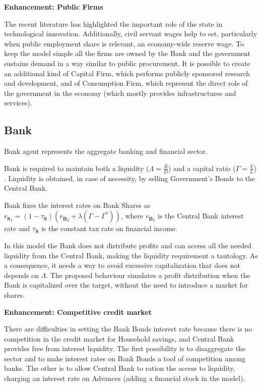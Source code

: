 \documentclass[a4paper, headings=standardclasses]{scrartcl}
\newenvironment{enh}[1][]{\begin{framed}\noindent\textbf{Enhancement: #1}\par}{\end{framed}}
\begin{document}
\begin{enh}[Public Firms]
	The recent literature has highlighted the important role of the state in technological innovation. Additionally, civil servant wages help to set, particularly when public employment share is relevant, an economy-wide reserve wage.
	To keep the model simple all the firms are owned by the Bank and the government sustains demand in a way similar to public procurement.
	It is possible to create an additional kind of Capital Firm, which performs publicly sponsored research and development, and of Consumption Firm, which represent the direct role of the government in the economy (which mostly provides infrastructures and services).
\end{enh}


\subsection{Bank}
Bank agent represents the aggregate banking and financial sector.

Bank is required to maintain both a liquidity ($\Lambda = \frac{R}{D}$) and a capital ratio ($\Gamma = \frac{V}{L}$) \parencite[see][]{caiani2016}. Liquidity is obtained, in case of necessity, by selling Government's Bonds to the Central Bank.

Bank fixes the interest rates on Bank Shares as ${r_\mathbf{S}}_t = (1 - \tau_\mathbf{S}) ({r_\mathbf{B}}_t + \lambda(\Gamma - \Gamma^*))$, where ${r_\mathbf{B}}_t$ is the Central Bank interest rate and $\tau_\mathbf{S}$ is the constant tax rate on financial income.

In this model the Bank does not distribute profits and can access all the needed liquidity from the Central Bank, making the liquidity requirement a tautology. As a consequence, it needs a way to avoid excessive capitalization that does not depends on $\Lambda$. The proposed behaviour simulates a profit distribution when the Bank is capitalized over the target, without the need to introduce a market for shares.

\begin{enh}[Competitive credit market]
	There are difficulties in setting the Bank Bonds interest rate because there is no competition in the credit market for Household savings, and Central Bank provides free from interest liquidity.
	The first possibility is to disaggregate the sector and to make interest rates on Bank Bonds a tool of competition among banks.
	The other is to allow Central Bank to ration the access to liquidity, charging an interest rate on Advances (adding a financial stock in the model).
\end{enh}
\end{document}
